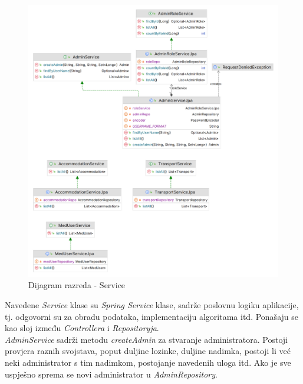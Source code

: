 			\begin{figure}[H]
				\includegraphics[width=\textwidth]{slike/service.PNG}
				\caption{Dijagram razreda - Service}
				\label{serviceDiagram}
			\end{figure}
			
			{Navedene \textit{Service} klase su \textit{Spring Service} klase, sadrže poslovnu logiku aplikacije, tj. odgovorni su za obradu podataka, implementaciju algoritama itd. Ponašaju se kao sloj između \textit{Controllera} i \textit{Repositoryja}.\\
			\textit{AdminService} sadrži metodu \textit{createAdmin} za stvaranje administratora. Postoji provjera raznih svojstava, poput duljine lozinke, duljine nadimka, postoji li već neki administrator s tim nadimkom, postojanje navedenih uloga itd. Ako je sve uspješno sprema se novi administrator u \textit{AdminRepository}.}\\
			
